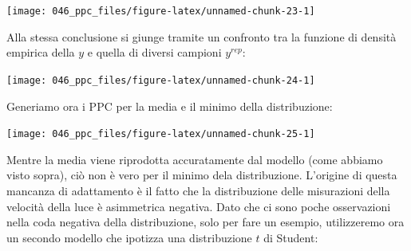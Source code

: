\documentclass[
  10pt,
  italian,
  a4paper,
  extrafontsizes,onecolumn,openright
  ]{memoir}
\newenvironment{Shaded}{\begin{snugshade}}{\end{snugshade}}
\newcommand{\AttributeTok}[1]{\textcolor[rgb]{0.77,0.63,0.00}{#1}}
\newcommand{\DecValTok}[1]{\textcolor[rgb]{0.00,0.00,0.81}{#1}}
\newcommand{\FunctionTok}[1]{\textcolor[rgb]{0.00,0.00,0.00}{#1}}
\newcommand{\NormalTok}[1]{#1}
\newcommand{\SpecialCharTok}[1]{\textcolor[rgb]{0.00,0.00,0.00}{#1}}
\newcommand{\StringTok}[1]{\textcolor[rgb]{0.31,0.60,0.02}{#1}}
\begin{document}
\begin{center}\texttt{[image: 046\_ppc\_files/figure-latex/unnamed-chunk-23-1]} \end{center}

\noindent
Alla stessa conclusione si giunge tramite un confronto tra la funzione di densità empirica della \(y\) e quella di diversi campioni \(y^{rep}\):

\begin{Shaded}
\end{Shaded}

\begin{center}\texttt{[image: 046\_ppc\_files/figure-latex/unnamed-chunk-24-1]} \end{center}

\noindent
Generiamo ora i PPC per la media e il minimo della distribuzione:

\begin{Shaded}
\end{Shaded}

\begin{center}\texttt{[image: 046\_ppc\_files/figure-latex/unnamed-chunk-25-1]} \end{center}

\noindent
Mentre la media viene riprodotta accuratamente dal modello (come abbiamo visto sopra), ciò non è vero per il minimo dela distribuzione. L'origine di questa mancanza di adattamento è il fatto che la distribuzione delle misurazioni della velocità della luce è asimmetrica negativa. Dato che ci sono poche osservazioni nella coda negativa della distribuzione, solo per fare un esempio, utilizzeremo ora un secondo modello che ipotizza una distribuzione \(t\) di Student:
\end{document}
